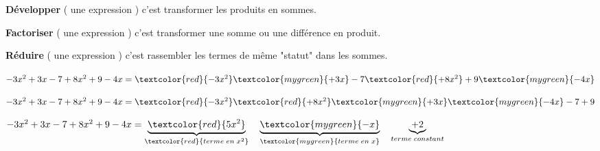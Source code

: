 \begin{definitions}
    {\bfseries Développer} ( une expression ) c'est transformer les produits en sommes.

    {\bfseries Factoriser} ( une expression ) c'est transformer une somme ou une différence en produit.

    {\bfseries Réduire} ( une expression ) c'est rassembler les termes de même "statut" dans les sommes.
\end{definitions}

\begin{exemple*1}
    \phantom{rrr}

    $-3x^{2}+3x-7+8x^{2}+9-4x=\textcolor{red}{-3x^{2}}\textcolor{mygreen}{+3x}-7\textcolor{red}{+8x^{2}}+9\textcolor{mygreen}{-4x}$

    \medskip
    $-3x^{2}+3x-7+8x^{2}+9-4x=\textcolor{red}{-3x^{2}} \textcolor{red}{+8x^{2}} \textcolor{mygreen}{+3x} \textcolor{mygreen}{-4x} -7+9$

    \medskip
    $-3x^{2}+3x-7+8x^{2}+9-4x=\underbrace{\textcolor{red}{5x^{2}}}_{\textcolor{red}{terme\;en\;x^2}}\quad \underbrace{\textcolor{mygreen}{-x}}_{\textcolor{mygreen}{terme\;en\;x}} \quad \underbrace{+ 2}_{terme\;constant}$
\end{exemple*1}